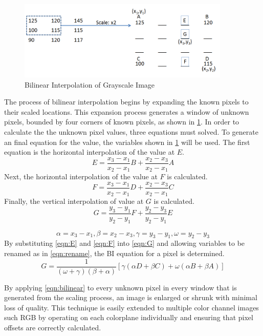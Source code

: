 \begin{figure}
  \centering
  \includegraphics[width=0.9\textwidth]{./img/bilinear_example.PNG}
  \caption{Bilinear Interpolation of Grayscale Image}
  \label{fig:bilinearExample}
\end{figure}
The process of bilinear interpolation begins by expanding the known pixels to their scaled locations.  This expansion process generates a window of unknown pixels, bounded by four corners of known pixels, as shown in \ref{fig:bilinearExample}.  In order to calculate the the unknown pixel values, three equations must solved.  To generate an final equation for the value, the variables shown in \ref{fig:bilinearExample} will be used.  The first equation is the horizontal interpolation of the value at $E$.
\begin{equation}
  E = \frac{x_3-x_1}{x_2-x_1}B + \frac{x_2-x_3}{x_2-x_1}A
  \label{eqn:E}
\end{equation}
Next, the horizontal interpolation of the value at $F$ is calculated.
\begin{equation}
  F = \frac{x_3-x_1}{x_2-x_1}D + \frac{x_2-x_3}{x_2-x_1}C
  \label{eqn:F}
\end{equation}
Finally, the vertical interpolation of value at $G$ is calculated.
\begin{equation}
  G = \frac{y_3-y_1}{y_2-y_1}F + \frac{y_2-y_3}{y_2-y_1}E
  \label{eqn:G}
\end{equation}

\begin{equation}
  \alpha = x_3 - x_1, 
  \beta = x_2 - x_3, 
  \gamma = y_3 - y_1, 
  \omega = y_2 - y_3
  \label{eqn:rename}
\end{equation}
By substituting \eqref{eqn:E} and \eqref{eqn:F} into \eqref{eqn:G} and allowing variables to be renamed as in \eqref{eqn:rename}, the BI equation for a pixel is determined.
\begin{equation}
  G = \frac{1}{(\omega + \gamma)(\beta + \alpha)}[\gamma(\alpha D + \beta C) + \omega(\alpha B + \beta A)]
  \label{eqn:bilinear}
\end{equation}

By applying \eqref{eqn:bilinear} to every unknown pixel in every window that is generated from the scaling process, an image is enlarged or shrunk with minimal loss of quality.  This technique is easily extended to multiple color channel images such RGB by operating on each colorplane individually and ensuring that pixel offsets are correctly calculated.
